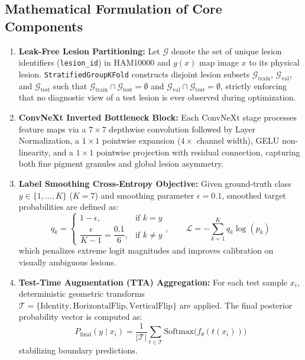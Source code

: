 \documentclass[12pt,a4paper]{article}
\begin{document}
\subsection{Mathematical Formulation of Core Components}
\begin{enumerate}[leftmargin=*]
    \item \textbf{Leak-Free Lesion Partitioning:} Let $\mathcal{G}$ denote the set of unique lesion identifiers (\texttt{lesion\_id}) in HAM10000 and $g(x)$ map image $x$ to its physical lesion. \texttt{StratifiedGroupKFold} constructs disjoint lesion subsets $\mathcal{G}_{\text{train}}$, $\mathcal{G}_{\text{val}}$, and $\mathcal{G}_{\text{test}}$ such that $\mathcal{G}_{\text{train}} \cap \mathcal{G}_{\text{test}} = \emptyset$ and $\mathcal{G}_{\text{val}} \cap \mathcal{G}_{\text{test}} = \emptyset$, strictly enforcing that no diagnostic view of a test lesion is ever observed during optimization.
    \item \textbf{ConvNeXt Inverted Bottleneck Block:} Each ConvNeXt stage processes feature maps via a $7\times 7$ depthwise convolution followed by Layer Normalization, a $1\times 1$ pointwise expansion ($4\times$ channel width), GELU non-linearity, and a $1\times 1$ pointwise projection with residual connection, capturing both fine pigment granules and global lesion asymmetry.
    \item \textbf{Label Smoothing Cross-Entropy Objective:} Given ground-truth class $y \in \{1, \dots, K\}$ ($K = 7$) and smoothing parameter $\epsilon = 0.1$, smoothed target probabilities are defined as:
    \begin{equation}
        q_k = \begin{cases} 1 - \epsilon, & \text{if } k = y \\ \dfrac{\epsilon}{K - 1} = \dfrac{0.1}{6}, & \text{if } k \neq y \end{cases}, \qquad \mathcal{L} = -\sum_{k=1}^{K} q_k \log(p_k)
    \end{equation}
    which penalizes extreme logit magnitudes and improves calibration on visually ambiguous lesions.
    \item \textbf{Test-Time Augmentation (TTA) Aggregation:} For each test sample $x_i$, deterministic geometric transforms $\mathcal{T} = \{\text{Identity}, \text{HorizontalFlip}, \text{VerticalFlip}\}$ are applied. The final posterior probability vector is computed as:
    \begin{equation}
        P_{\text{final}}(y \mid x_i) = \frac{1}{|\mathcal{T}|} \sum_{t \in \mathcal{T}} \text{Softmax}\big(f_\theta(t(x_i))\big)
    \end{equation}
    stabilizing boundary predictions.
\end{enumerate}
\end{document}
